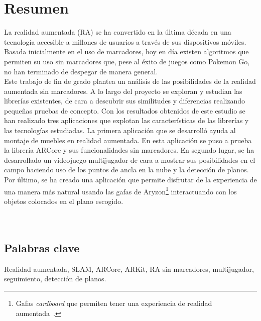 \newpage
\chapter*{Resumen}
La realidad aumentada (RA) se ha convertido en la última década en una tecnología accesible a millones de usuarios a través de sus dispositivos móviles. Basada inicialmente en el uso de marcadores, hoy en día existen algoritmos que permiten su uso sin marcadores que, pese al éxito de juegos como Pokemon Go, no han terminado de despegar de manera general.\\

Este trabajo de fin de grado plantea un análisis de las posibilidades de la realidad aumentada sin marcadores. A lo largo del proyecto se exploran y estudian las librerías existentes, de cara a descubrir sus similitudes y diferencias realizando pequeñas pruebas de concepto. Con los resultados obtenidos de este estudio se han realizado tres aplicaciones que explotan las características de las librerías y las tecnologías estudiadas. La primera aplicación que se desarrolló ayuda al montaje de muebles en realidad aumentada. En esta aplicación se puso a prueba la librería ARCore y sus funcionalidades sin marcadores. En segundo lugar, se ha desarrollado un videojuego multijugador de cara a mostrar sus posibilidades en el campo haciendo uso de los puntos de ancla en la nube y la detección de planos. Por último, se ha creado una aplicación que permite disfrutar de la experiencia de una manera más natural usando las gafas de Aryzon\footnote{Gafas \textit{cardboard} que permiten tener una experiencia de realidad aumentada~\cite{Aryzon}.} interactuando con los objetos colocados en el plano escogido.\\
\\
\\

\section*{Palabras clave}
Realidad aumentada, SLAM, ARCore, ARKit, RA sin marcadores, multijugador, seguimiento, detección de planos.

\noindent
